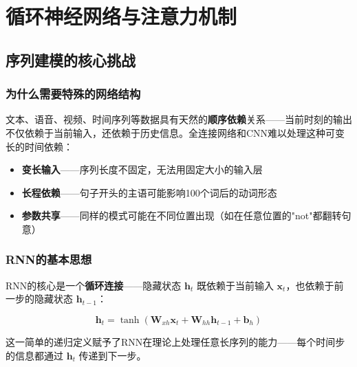 
\chapter{循环神经网络与注意力机制}


\section{序列建模的核心挑战}

\subsection{为什么需要特殊的网络结构}

文本、语音、视频、时间序列等数据具有天然的\textbf{顺序依赖}关系——当前时刻的输出不仅依赖于当前输入，还依赖于历史信息。全连接网络和CNN难以处理这种可变长的时间依赖：

\begin{itemize}
    \item \textbf{变长输入}——序列长度不固定，无法用固定大小的输入层
    \item \textbf{长程依赖}——句子开头的主语可能影响100个词后的动词形态
    \item \textbf{参数共享}——同样的模式可能在不同位置出现（如在任意位置的"not"都翻转句意）
\end{itemize}

\subsection{RNN的基本思想}

RNN的核心是一个\textbf{循环连接}——隐藏状态 $\mathbf{h}_t$ 既依赖于当前输入 $\mathbf{x}_t$，也依赖于前一步的隐藏状态 $\mathbf{h}_{t-1}$：

\[
\mathbf{h}_t = \tanh(\mathbf{W}_{xh}\mathbf{x}_t + \mathbf{W}_{hh}\mathbf{h}_{t-1} + \mathbf{b}_h)
\]

这一简单的递归定义赋予了RNN在理论上处理任意长序列的能力——每个时间步的信息都通过 $\mathbf{h}_t$ 传递到下一步。

